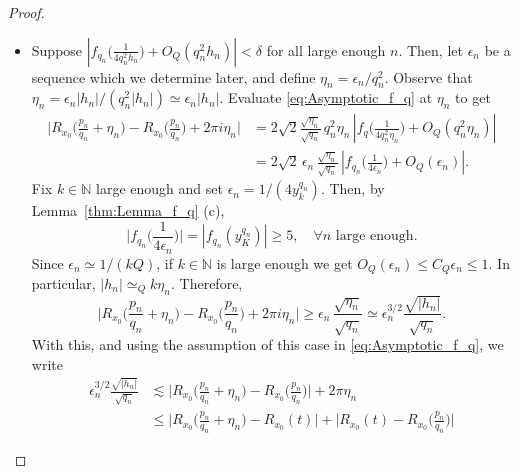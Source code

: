 \documentclass[11pt,reqno]{amsart}
\theoremstyle{definition}
\begin{document}
\begin{proof}
\begin{itemize}
\begin{itemize}
\begin{itemize}
		\item[\textbf{Case 2.1.2.}] Suppose $\left|  f_{q_n}\Big( \frac{1}{4q_n^2 h_n}  \Big)  + O_Q\left( q_n^2 h_n  \right) \right| < \delta$ for all large enough $n$. 
		Then, let $\epsilon_n$ be a sequence which we determine later,
		and define $\eta_n = \epsilon_n /q_n^2$. 
		Observe that $\eta_n = \epsilon_n |h_n| / (q_n^2 |h_n|) \simeq \epsilon_n |h_n|$. 
		Evaluate \eqref{eq:Asymptotic_f_q} at $\eta_n$ to get 
		\begin{equation}
		\begin{split}
		\Big|  R_{x_0}\Big( \frac{p_n}{q_n} + \eta_n \Big) - R_{x_0}\Big( \frac{p_n}{q_n} \Big) + 2\pi i \eta_n  \Big|
	& = 2\sqrt{2}  \frac{\sqrt{\eta_n}}{\sqrt{q_n}} \,  q_n^2 \eta_n \,
\left|  f_q\Big( \frac{1}{4q_n^2 \eta_n}  \Big)  + O_Q\left( q_n^{2} \eta_n  \right)
\right| \\
& = 2\sqrt{2} \,   \epsilon_n \,  \frac{\sqrt{\eta_n}}{\sqrt{q_n}} \,  
\left|  f_{q_n}\Big( \frac{1}{4 \epsilon_n}  \Big)  + O_Q\left( \epsilon_n  \right)
\right|. 
\end{split}
		\end{equation}
		Fix $k \in \mathbb N$ large enough and set $\epsilon_n = 1/(4y_k^{q_n})$.
		Then, by Lemma~\ref{thm:Lemma_f_q} (c), 
		\begin{equation}
		\Big|  f_{q_n}\Big( \frac{1}{4 \epsilon_n}  \Big) \Big| = \left|  f_{q_n}( y_K^{q_n}) \right| \geq 5,  \quad \forall n \text{ large enough.}
		\end{equation}
		Since $\epsilon_n \simeq 1/(kQ)$, 
		if $k \in \mathbb N$ is large enough we get $ O_Q\left( \epsilon_n  \right) \leq C_Q \epsilon_n \leq 1$.
		In particular, $|h_n| \simeq_Q k \eta_n$. 
		Therefore, 
		\begin{equation}
		\Big|  R_{x_0}\Big( \frac{p_n}{q_n} + \eta_n \Big) - R_{x_0}\Big( \frac{p_n}{q_n} \Big) + 2\pi i \eta_n  \Big|
 \geq  \epsilon_n\,  \frac{\sqrt{\eta_n}}{\sqrt{q_n}} 
 \simeq \epsilon_n^{3/2} \frac{\sqrt{|h_n|}}{\sqrt{q_n}}. 
		\end{equation}
		With this, and using the assumption of this case in \eqref{eq:Asymptotic_f_q}, we write
		\begin{equation}
		\begin{split}
		\epsilon_n^{3/2} \frac{\sqrt{|h_n|}}{\sqrt{q_n}}
		&  \lesssim \Big|  R_{x_0}\Big( \frac{p_n}{q_n} + \eta_n \Big) - R_{x_0}\Big( \frac{p_n}{q_n} \Big)\Big| + 2\pi \eta_n   \\
		& \leq \Big|  R_{x_0}\Big( \frac{p_n}{q_n} + \eta_n \Big) - R_{x_0}(t) \Big| 
		+ \Big| R_{x_0}(t) - R_{x_0}\Big( \frac{p_n}{q_n} \Big)\Big| 

\end{split}
\end{equation}
\end{itemize}
\end{itemize}
\end{itemize}
\end{proof}
\end{document}
